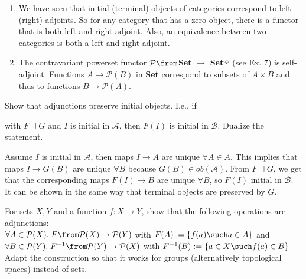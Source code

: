 \begin{answer}
\begin{enumerate}
\item We have seen that initial (terminal) objects of categories correspond to left (right) adjoints. So for any category that has a zero object, there is a functor that is both left and right adjoint. Also, an equivalence between two categories is both a left and right adjoint.
\item The contravariant powerset functor $\mathcal{P} \from $\textbf {Set }$ \to$\textbf{ Set}$^{op}$ (see Ex. 7) is self-adjoint. Functions $A \to \mathcal{P}(B)$ in \textbf{Set} correspond to subsets of $A \times B$ and thus to functions $B \to \mathcal{P}(A)$.
\end{enumerate}
\end{answer}

\begin{exercise}
Show that adjunctions preserve initial objects. I.e., if
with $F\dashv G$ and $I$ is initial in $ \mathscr{A}$, then $F(I)$ is initial in $\mathscr{B}$. Dualize the statement.
\end{exercise}

\begin{answer}
Assume $I$ is initial in $ \mathscr{A}$, then maps $I \to A$ are unique $\forall A \in A$. This implies that maps  $I \to G(B)$ are unique $\forall B$ because $G(B) \in ob(\mathscr{A})$. From $F\dashv G$, we get that the corresponding maps $F(I) \to B$ are unique $\forall B$, so $F(I)$ initial in $\mathscr{B}$.\\ It can be shown in the same way that terminal objects are preserved by $G$.\end{answer}

\begin{exercise}
For sets $X, Y$ and a function $f: X \to Y$, show that the following operations are adjunctions:\\
$ \forall A \in \mathcal{P}(X).\; F \from \mathcal {P}(X) \to \mathcal {P}(Y ) $ with $ F(A) := \{f(a) \such a \in A \}$ and\\
$\forall B\in \mathcal{P}(Y). \; F^{-1} \from \mathcal {P}(Y) \to \mathcal {P}(X)$ with $ F^{-1}(B):=\{a\in X \such f(a)\in B\}$
\\Adapt the construction so that it works for groups (alternatively topological spaces) instead of sets.
\end{exercise}

